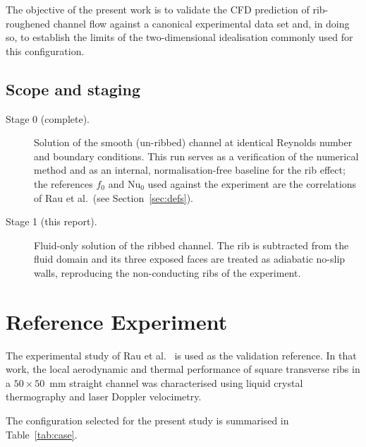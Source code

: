 \documentclass[11pt,a4paper]{article}
\newcommand{\Nuss}{\mathrm{Nu}}
\begin{document}
The objective of the present work is to validate the CFD prediction of
rib-roughened channel flow against a canonical experimental data set and, in
doing so, to establish the limits of the two-dimensional idealisation
commonly used for this configuration.

\subsection{Scope and staging}

\begin{description}
  \item[Stage 0 (complete).] Solution of the smooth (un-ribbed) channel at
  identical Reynolds number and boundary conditions. This run serves as a
  verification of the numerical method and as an internal, normalisation-free
  baseline for the rib effect; the references $f_{0}$ and $\Nuss_{0}$ used
  against the experiment are the correlations of Rau et al.\ (see
  Section~\ref{sec:defs}).

  \item[Stage 1 (this report).] Fluid-only solution of the ribbed channel.
  The rib is subtracted from the fluid domain and its three exposed faces
  are treated as adiabatic no-slip walls, reproducing the non-conducting
  ribs of the experiment.
\end{description}

\section{Reference Experiment}

The experimental study of Rau et al.~\cite{rau1996} is used as the
validation reference. In that work, the local aerodynamic and thermal
performance of square transverse ribs in a $50 \times 50$~mm straight
channel was characterised using liquid crystal thermography and laser
Doppler velocimetry.

The configuration selected for the present study is summarised in
Table~\ref{tab:case}.
\end{document}
